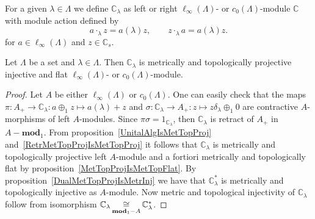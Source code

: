 For a given $\lambda\in\Lambda$ we define $\mathbb{C}_\lambda$ as left or right
$\ell_\infty(\Lambda)$- or $c_0(\Lambda)$-module $\mathbb{C}$ with module action
defined by
$$
a\cdot_\lambda z=a(\lambda)z,\qquad z\cdot_\lambda a=a(\lambda) z.
$$
for $a\in \ell_\infty(\Lambda)$ and $z\in\mathbb{C}_s$. 

\begin{proposition}\label{OneDimlInftyc0ModMetTopProjIngFlat} Let $\Lambda$ be a
set and $\lambda\in\Lambda$. Then $\mathbb{C}_\lambda$ is metrically and
topologically projective injective and flat $\ell_\infty(\Lambda)$- or
$c_0(\Lambda)$-module.
\end{proposition}
\begin{proof} Let $A$ be either $\ell_\infty(\Lambda)$ or $c_0(\Lambda)$. One
can easily check that the 
maps $\pi:A_+\to\mathbb{C}_\lambda:a\oplus_1 z\mapsto a(\lambda)+z$ 
and $\sigma:\mathbb{C}_\lambda\to A_+:z\mapsto z\delta_\lambda\oplus_1 0$ 
are contractive $A$-morphisms of left $A$-modules.
Since $\pi\sigma=1_{\mathbb{C}_\lambda}$, then $\mathbb{C}_\lambda$ is retract
of $A_+$ in $A-\mathbf{mod}_1$. From proposition~\ref{UnitalAlgIsMetTopProj}
and~\ref{RetrMetTopProjIsMetTopProj} it follows that $\mathbb{C}_\lambda$ is
metrically and topologically projective left $A$-module and a fortiori
metrically and topologically flat by proposition~\ref{MetTopProjIsMetTopFlat}.
By proposition~\ref{DualMetTopProjIsMetrInj} we have that $\mathbb{C}_\lambda^*$
is metrically and topologically injective as $A$-module. Now metric and
topological injectivity of $\mathbb{C}_\lambda$ follow from isomorphism
$\mathbb{C}_\lambda\mathop{\mathbin{\cong}}\limits_{\mathbf{mod}_1-A}\mathbb{C}_\lambda^*$.
\end{proof}

